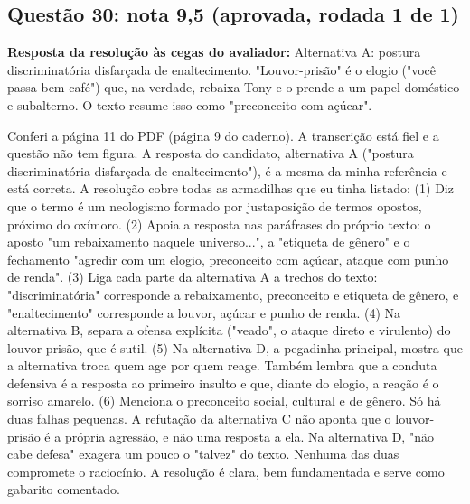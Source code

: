 \documentclass{article}%
\begin{document}
\subsection*{Questão 30: nota 9,5 (aprovada, rodada 1 de 1)}%
\textbf{Resposta da resolução às cegas do avaliador:} Alternativa A: postura discriminatória disfarçada de enaltecimento. "Louvor{-}prisão" é o elogio ("você passa bem café") que, na verdade, rebaixa Tony e o prende a um papel doméstico e subalterno. O texto resume isso como "preconceito com açúcar".\par %
Conferi a página 11 do PDF (página 9 do caderno). A transcrição está fiel e a questão não tem figura. A resposta do candidato, alternativa A ("postura discriminatória disfarçada de enaltecimento"), é a mesma da minha referência e está correta.\newline%
\newline%
A resolução cobre todas as armadilhas que eu tinha listado:\newline%
(1) Diz que o termo é um neologismo formado por justaposição de termos opostos, próximo do oxímoro.\newline%
(2) Apoia a resposta nas paráfrases do próprio texto: o aposto "um rebaixamento naquele universo...", a "etiqueta de gênero" e o fechamento "agredir com um elogio, preconceito com açúcar, ataque com punho de renda".\newline%
(3) Liga cada parte da alternativa A a trechos do texto: "discriminatória" corresponde a rebaixamento, preconceito e etiqueta de gênero, e "enaltecimento" corresponde a louvor, açúcar e punho de renda.\newline%
(4) Na alternativa B, separa a ofensa explícita ("veado", o ataque direto e virulento) do louvor{-}prisão, que é sutil.\newline%
(5) Na alternativa D, a pegadinha principal, mostra que a alternativa troca quem age por quem reage. Também lembra que a conduta defensiva é a resposta ao primeiro insulto e que, diante do elogio, a reação é o sorriso amarelo.\newline%
(6) Menciona o preconceito social, cultural e de gênero.\newline%
\newline%
Só há duas falhas pequenas. A refutação da alternativa C não aponta que o louvor{-}prisão é a própria agressão, e não uma resposta a ela. Na alternativa D, "não cabe defesa" exagera um pouco o "talvez" do texto. Nenhuma das duas compromete o raciocínio. A resolução é clara, bem fundamentada e serve como gabarito comentado.%
\end{document}
